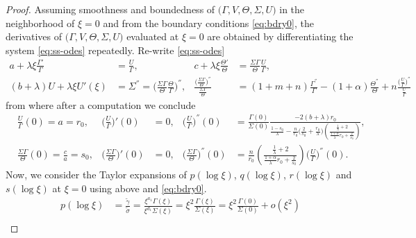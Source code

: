 \documentclass[a4paper,11pt]{article}
\def\tg{{\tilde{\gamma}}}
\def\ts{{\tilde{\sigma}}}
\theoremstyle{remark}
\begin{document}
\begin{proof}
Assuming smoothness and boundedness of $\big(\Gamma,V,\Theta,\Sigma,U\big)$ in the neighborhood of $\xi=0$ and from the boundary conditions \eqref{eq:bdry0}, the derivatives of $\big(\Gamma,V,\Theta,\Sigma,U\big)$ evaluated at $\xi=0$ are obtained by differentiating the system \eqref{eq:ss-odes} repeatedly.
Re-write \eqref{eq:ss-odes}
\begin{align*}
  a + \lambda\xi\frac{\Gamma'}{\Gamma} &= \frac{U}{\Gamma}, &
  c + \lambda\xi\frac{\Theta'}{\Theta} &= \frac{\Sigma\Gamma}{\Theta} \frac{U}{\Gamma},\\
  (b+\lambda)U  + \lambda \xi U'(\xi) &= \Sigma^{''} = \Big(\frac{\Sigma\Gamma}{\Theta} \frac{\Theta}{\Gamma}\Big)^{''}, &
  \frac{\Big(\frac{\Sigma\Gamma}{\Theta}\Big)^{''}}{\frac{\Sigma\Gamma}{\Theta}} &= (1+m+n)\frac{\Gamma^{''}}{\Gamma}-(1+\alpha) \frac{\Theta^{''}}{\Theta} + n \frac{ \big(\frac{U}{\Gamma}\big)^{''}}{\frac{U}{\Gamma}}
\end{align*}
from where after a computation we conclude
\begin{align*}
&\frac{U}{\Gamma}(0) = a = r_0,  & \Big(\frac{U}{\Gamma}\Big)'(0)&=0, & \Big(\frac{U}{\Gamma}\Big)^{''}(0) &= \frac{\Gamma(0)}{\Sigma(0)} \frac{-2(b+\lambda)r_0}{\frac{1-s_0}{\lambda}-\frac{n}{r_0}\Big(\frac{2}{s_0} + \frac{r_0}{\lambda}\Big)\left(\frac{ \frac{1}{\lambda}+2}{ \frac{1+\alpha}{\lambda}r_0 + \frac{2}{s_0}}\right)},\\
&\frac{\Sigma\Gamma}{\Theta}(0) = \frac{c}{a} = s_0,  & \Big(\frac{\Sigma\Gamma}{\Theta}\Big)'(0)&=0, &
\Big(\frac{\Sigma\Gamma}{\Theta}\Big)^{''}(0) &= \frac{n}{r_0} \left(\frac{ \frac{1}{\lambda}+2 }{ \frac{1+\alpha}{\lambda}r_0 + \frac{2}{s_0}}\right)\Big(\frac{U}{\Gamma}\Big)^{''}(0).
\end{align*}
Now, we consider the Taylor expansions of $p(\log\xi)$, $q(\log\xi)$, $r(\log\xi)$ and $s(\log\xi)$ at $\xi=0$ using above and \eqref{eq:bdry0}.
\begin{align*}
 p(\log\xi) &= \frac{ \tg }{\ts} = \frac{ \xi^{a_1} \Gamma(\xi)}{\xi^{d_1} \Sigma(\xi)} = \xi^2\frac{\Gamma(\xi)}{\Sigma(\xi)} = \xi^2\frac{\Gamma(0)}{\Sigma(0)} + o(\xi^2) \\

\end{align*}
\end{proof}
\end{document}
